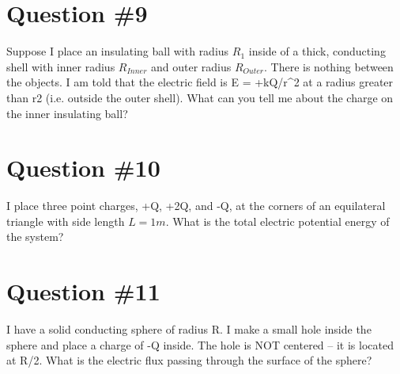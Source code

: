 \documentclass[12pt]{article}
\begin{document}
\section*{Question \#9}
Suppose I place an insulating ball with radius $R_1$ inside of a thick, conducting shell with inner radius $R_{Inner}$ and outer radius $R_{Outer}$.  There is nothing between the objects.  I am told that the electric field is E = +kQ/r^2 at a radius greater than r2 (i.e. outside the outer shell).  What can you tell me about the charge on the inner insulating ball?

\section*{Question \#10}
I place three point charges, +Q, +2Q, and -Q, at the corners of an equilateral triangle with side length $L = 1 m$.  What is the total electric potential energy of the system?

\section*{Question \#11}
I have a solid conducting sphere of radius R.  I make a small hole inside the sphere and place a charge of -Q inside.  The hole is NOT centered – it is located at R/2.  
What is the electric flux passing through the surface of the sphere?
\end{document}
